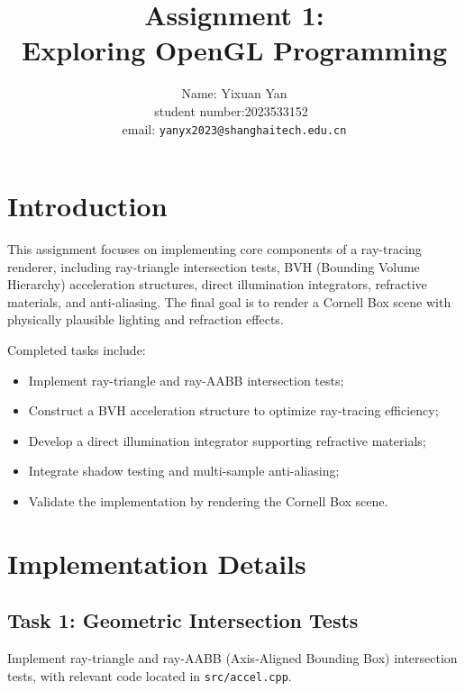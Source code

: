 \documentclass[acmtog]{acmart}
\title{Assignment 1:\\ {Exploring OpenGL Programming}}
\author{Name: \quad Yixuan Yan\\ student number:2023533152\
	\\email: \quad \texttt{yanyx2023@shanghaitech.edu.cn}}
\begin{document}
	\maketitle
	
	\vspace*{2 ex}
	
	\section{Introduction}
	This assignment focuses on implementing core components of a ray-tracing renderer, including ray-triangle intersection tests, BVH (Bounding Volume Hierarchy) acceleration structures, direct illumination integrators, refractive materials, and anti-aliasing. The final goal is to render a Cornell Box scene with physically plausible lighting and refraction effects.
	
	Completed tasks include:
	\begin{itemize}
		\item Implement ray-triangle and ray-AABB intersection tests;
		\item Construct a BVH acceleration structure to optimize ray-tracing efficiency;
		\item Develop a direct illumination integrator supporting refractive materials;
		\item Integrate shadow testing and multi-sample anti-aliasing;
		\item Validate the implementation by rendering the Cornell Box scene.
	\end{itemize}
	
	
	\section{Implementation Details}
	\subsection{Task 1: Geometric Intersection Tests}
	Implement ray-triangle and ray-AABB (Axis-Aligned Bounding Box) intersection tests, with relevant code located in \texttt{src/accel.cpp}.
	
\end{document}
